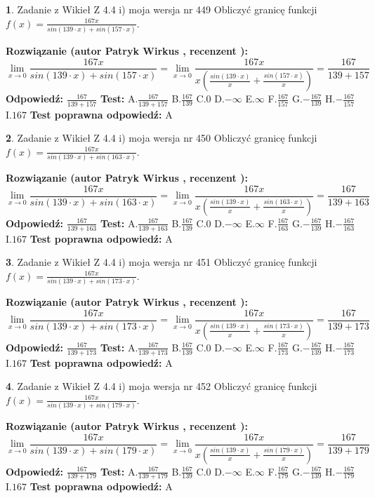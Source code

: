 \documentclass[12pt, a4paper]{article}
\theoremstyle{definition} %
\newtheorem{zad}{}
\newcommand{\zadStart}[1]{\begin{zad}#1\newline}
\newcommand{\zadStop}{\end{zad}}
\newcommand{\rozwStart}[2]{\noindent \textbf{Rozwiązanie (autor #1 , recenzent #2): }\newline}
\newcommand{\rozwStop}{\newline}
\newcommand{\odpStart}{\noindent \textbf{Odpowiedź:}\newline}
\newcommand{\odpStop}{\newline}
\newcommand{\testStart}{\noindent \textbf{Test:}\newline}
\newcommand{\testStop}{\newline}
\newcommand{\kluczStart}{\noindent \textbf{Test poprawna odpowiedź:}\newline}
\newcommand{\kluczStop}{\newline}
\begin{document}
\zadStart{Zadanie z Wikieł Z 4.4 i) moja wersja nr 449}
Obliczyć granicę funkcji $f(x)=\frac{167x}{sin(139\cdot x) +sin(157\cdot x)}$.
\zadStop
\rozwStart{Patryk Wirkus}{}
$$\lim\limits_{x\to 0}\frac{167x}{sin(139\cdot x) +sin(157\cdot x)}=\lim\limits_{x\to 0}\frac{167x}{x(\frac{sin(139\cdot x)}{x}+\frac{sin(157\cdot x)}{x})}=\frac{167}{139+157}$$
\rozwStop
\odpStart
$\frac{167}{139+157}$
\odpStop
\testStart
A.$\frac{167}{139+157}$
B.$\frac{167}{139}$
C.$0$
D.$-\infty$
E.$\infty$
F.$\frac{167}{157}$
G.$-\frac{167}{139}$
H.$-\frac{167}{157}$
I.$167$
\testStop
\kluczStart
A
\kluczStop



\zadStart{Zadanie z Wikieł Z 4.4 i) moja wersja nr 450}
Obliczyć granicę funkcji $f(x)=\frac{167x}{sin(139\cdot x) +sin(163\cdot x)}$.
\zadStop
\rozwStart{Patryk Wirkus}{}
$$\lim\limits_{x\to 0}\frac{167x}{sin(139\cdot x) +sin(163\cdot x)}=\lim\limits_{x\to 0}\frac{167x}{x(\frac{sin(139\cdot x)}{x}+\frac{sin(163\cdot x)}{x})}=\frac{167}{139+163}$$
\rozwStop
\odpStart
$\frac{167}{139+163}$
\odpStop
\testStart
A.$\frac{167}{139+163}$
B.$\frac{167}{139}$
C.$0$
D.$-\infty$
E.$\infty$
F.$\frac{167}{163}$
G.$-\frac{167}{139}$
H.$-\frac{167}{163}$
I.$167$
\testStop
\kluczStart
A
\kluczStop



\zadStart{Zadanie z Wikieł Z 4.4 i) moja wersja nr 451}
Obliczyć granicę funkcji $f(x)=\frac{167x}{sin(139\cdot x) +sin(173\cdot x)}$.
\zadStop
\rozwStart{Patryk Wirkus}{}
$$\lim\limits_{x\to 0}\frac{167x}{sin(139\cdot x) +sin(173\cdot x)}=\lim\limits_{x\to 0}\frac{167x}{x(\frac{sin(139\cdot x)}{x}+\frac{sin(173\cdot x)}{x})}=\frac{167}{139+173}$$
\rozwStop
\odpStart
$\frac{167}{139+173}$
\odpStop
\testStart
A.$\frac{167}{139+173}$
B.$\frac{167}{139}$
C.$0$
D.$-\infty$
E.$\infty$
F.$\frac{167}{173}$
G.$-\frac{167}{139}$
H.$-\frac{167}{173}$
I.$167$
\testStop
\kluczStart
A
\kluczStop



\zadStart{Zadanie z Wikieł Z 4.4 i) moja wersja nr 452}
Obliczyć granicę funkcji $f(x)=\frac{167x}{sin(139\cdot x) +sin(179\cdot x)}$.
\zadStop
\rozwStart{Patryk Wirkus}{}
$$\lim\limits_{x\to 0}\frac{167x}{sin(139\cdot x) +sin(179\cdot x)}=\lim\limits_{x\to 0}\frac{167x}{x(\frac{sin(139\cdot x)}{x}+\frac{sin(179\cdot x)}{x})}=\frac{167}{139+179}$$
\rozwStop
\odpStart
$\frac{167}{139+179}$
\odpStop
\testStart
A.$\frac{167}{139+179}$
B.$\frac{167}{139}$
C.$0$
D.$-\infty$
E.$\infty$
F.$\frac{167}{179}$
G.$-\frac{167}{139}$
H.$-\frac{167}{179}$
I.$167$
\testStop
\kluczStart
A
\kluczStop
\end{document}
